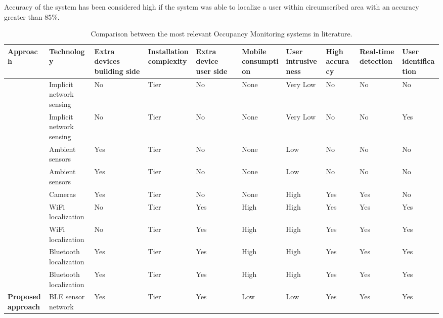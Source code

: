 Accuracy of the system has been considered high if the system was able to localize a user within circumscribed area with an accuracy greater than 85\%. 
%
%
\begin{sidewaystable}
%
\caption[Comparison between the most relevant Occupancy Monitoring systems in literature.]{Comparison between the most relevant Occupancy Monitoring systems in literature.}
%
\label{tab:od_soa}
%
\centering
%
\renewcommand{\arraystretch}{0.65}
%
\begin{tabulary}{\textheight}{>{\bfseries}L L L L L L L L L L}
%
\toprule
%
\textbf{Approach} &
	\textbf{Technology}	& \textbf{Extra devices building side}	 & \textbf{Installation complexity}
	& \textbf{Extra device user side} & \textbf{Mobile consumption} & \textbf{User intrusiveness}
	& \textbf{High accuracy} & \textbf{Real-time detection} & \textbf{User identification}\\ 
%
\midrule
%
\cite{Melfi2011}  	& Implicit network sensing & No & Tier  & No & None & Very Low & No & No & No\\
%
\cite{Balaji2013}  	& Implicit network sensing & No & Tier  & No & None & Very Low & No & No & Yes\\
%
\midrule
%
\cite{Beltran2013}  & Ambient sensors & Yes	& Tier  & No & None & Low & No & No & No\\
%
\cite{Cossio2012}   & Ambient sensors & Yes	& Tier  & No & None & Low & No & No & No\\
%
\midrule
%
\cite{Erickson2013} & Cameras & Yes	& Tier  & No	& None & High & Yes & Yes & No\\
%
\midrule
%
\cite{Jiang2012}  	& WiFi localization	& No & Tier  & Yes & High & High & Yes & Yes & Yes\\
%
\cite{Beder2012}  	& WiFi localization	& No & Tier  & Yes & High & High & Yes & Yes & Yes\\
%
\cite{Zhu2014}  	& Bluetooth localization & Yes & Tier  & Yes & High & High & Yes & Yes & Yes\\
%
\cite{Conte2014}  	& Bluetooth localization & Yes & Tier  & Yes	& High & High & Yes & Yes & Yes\\
%
\midrule
%
Proposed approach 	& BLE sensor network & Yes & Tier  & Yes & Low & Low & Yes & Yes & Yes\\
%
\bottomrule 
%
\end{tabulary}
%
\end{sidewaystable}



